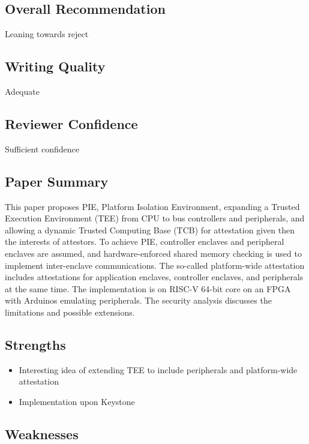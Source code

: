 \documentclass[9pt]{article}
\begin{document}
\subsection{Overall Recommendation}


  Leaning towards reject


\subsection{Writing Quality}


  Adequate


\subsection{Reviewer Confidence}


  Sufficient confidence


\subsection{Paper Summary}

This paper proposes PIE, Platform Isolation Environment, expanding a
Trusted Execution Environment (TEE) from CPU to bus controllers and
peripherals, and allowing a dynamic Trusted Computing Base (TCB) for
attestation given then the interests of attestors. To achieve PIE,
controller enclaves and peripheral enclaves are assumed, and
hardware-enforced shared memory checking is used to implement
inter-enclave communications. The so-called platform-wide attestation
includes attestations for application enclaves, controller enclaves, and
peripherals at the same time. The implementation is on RISC-V 64-bit
core on an FPGA with Arduinos emulating peripherals. The security
analysis discusses the limitations and possible extensions.

\subsection{Strengths}

\begin{itemize}

\item
  Interesting idea of extending TEE to include peripherals and
  platform-wide attestation
\item
  Implementation upon Keystone
\end{itemize}

\subsection{Weaknesses}
\end{document}
